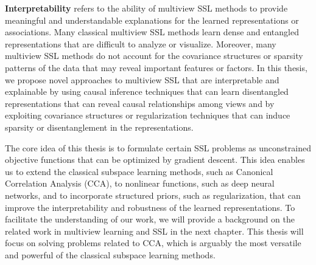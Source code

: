 \textbf{Interpretability} refers to the ability of multiview SSL methods to provide meaningful and understandable explanations for the learned representations or associations. Many classical multiview SSL methods learn dense and entangled representations that are difficult to analyze or visualize. Moreover, many multiview SSL methods do not account for the covariance structures or sparsity patterns of the data that may reveal important features or factors. In this thesis, we propose novel approaches to multiview SSL that are interpretable and explainable by using causal inference techniques that can learn disentangled representations that can reveal causal relationships among views and by exploiting covariance structures or regularization techniques that can induce sparsity or disentanglement in the representations.

The core idea of this thesis is to formulate certain SSL problems as unconstrained objective functions that can be optimized by gradient descent. This idea enables us to extend the classical subspace learning methods, such as Canonical Correlation Analysis (CCA), to nonlinear functions, such as deep neural networks, and to incorporate structured priors, such as regularization, that can improve the interpretability and robustness of the learned representations. To facilitate the understanding of our work, we will provide a background on the related work in multiview learning and SSL in the next chapter. This thesis will focus on solving problems related to CCA, which is arguably the most versatile and powerful of the classical subspace learning methods.






